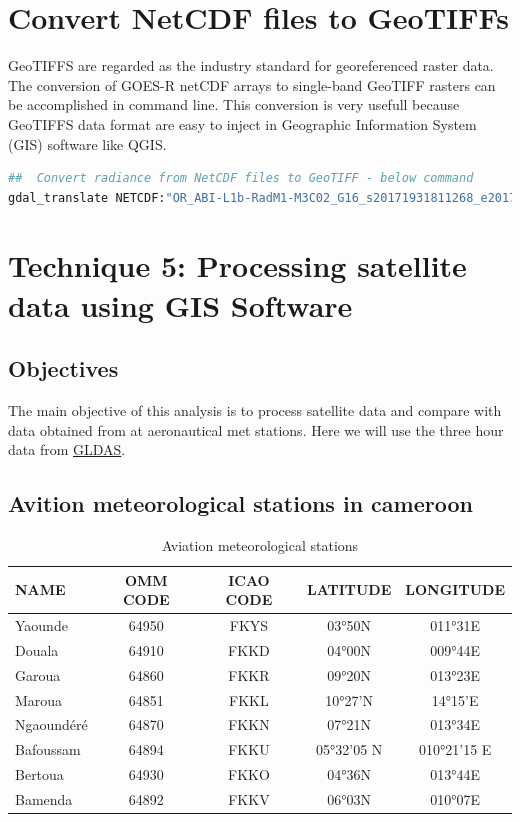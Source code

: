 \section{Convert NetCDF files to GeoTIFFs }
GeoTIFFS are regarded as the industry standard for georeferenced raster data.
The conversion of GOES-R netCDF arrays to single-band GeoTIFF rasters can be 
accomplished in command line. This conversion is very usefull because GeoTIFFS data format are easy to inject in Geographic Information System (GIS) software like QGIS.
\begin{lstlisting}[language=Bash]
##  Convert radiance from NetCDF files to GeoTIFF - below command
gdal_translate NETCDF:"OR_ABI-L1b-RadM1-M3C02_G16_s20171931811268_e20171931811326_c20171931811356.nc":OR_ABI-L1b-RadM1-M3C02_G16_s20171931811268_e20171931811326_c20171931811356.tif
\end{lstlisting}

\section{Technique 5: Processing satellite data using GIS Software}
\subsection{Objectives}
The main objective of this analysis is to process satellite data and compare with data obtained from at aeronautical met stations. Here we will use the three hour data from  \href{https://ldas.gsfc.nasa.gov/gldas}{GLDAS}.
\subsection{Avition meteorological stations in cameroon}


\begin{table}[H]
\caption{Aviation meteorological stations}
\label{tab:Aviation meteorological stations}
\begin{center}
\begin{tabular}{| l | c | c | c | c |}
\hline
\textbf{NAME} & \textbf{OMM CODE} & \textbf{ICAO CODE} & \textbf{LATITUDE} & \textbf{LONGITUDE}\\[2pt] \hline
Yaounde	& 64950&	FKYS&	03°50N&	011°31E \\\hline
Douala	& 64910	& FKKD	& 04°00N& 	009°44E \\\hline
Garoua	& 64860& 	FKKR& 	09°20N& 	013°23E\\\hline
Maroua	& 64851	& FKKL& 	10°27’N	& 14°15’E\\\hline
Ngaoundéré& 	64870& 	FKKN& 	07°21N& 013°34E\\\hline
Bafoussam& 	64894& 	FKKU& 	05°32’05 N& 	010°21’15 E\\\hline
Bertoua& 	64930& 	FKKO& 	04°36N& 	013°44E\\\hline
Bamenda& 	64892& 	FKKV& 	06°03N& 	010°07E\\\hline
\end{tabular}
\end{center}
\end{table}


